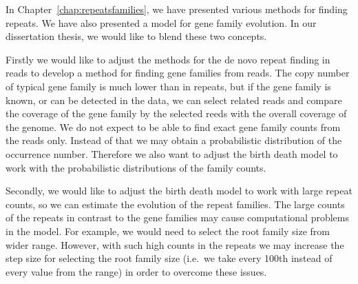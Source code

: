 In Chapter~\ref{chap:repeatsfamilies}, we have presented various methods for finding repeats. We have also presented a model for gene family evolution.
In our dissertation thesis, we would like to blend these two concepts.

Firstly we would like to adjust the methods for the de novo repeat finding in reads to develop a method for finding gene families from reads.
The copy number of typical gene family is much lower than in repeats, but if the gene family is known, or can be detected in the data, we can select related reads and compare the coverage of the gene family by the selected reeds with the overall coverage of the genome.
We do not expect to be able to find exact gene family counts from the reads only.
Instead of that we may obtain a probabilistic distribution of the occurrence number.
Therefore we also want to adjust the birth death model to work with the probabilistic distributions of the family counts.

Secondly, we would like to adjust the birth death model to work with large repeat counts, so we can estimate the evolution of the repeat families. The large counts of the repeats in contrast to the gene families may cause computational problems in the model. For example, we would need to select the root family size from wider range.
However, with such high counts in the repeats we may increase the step size for selecting the root family size (i.e.\ we take every 100th instead of every value from the range) in order to overcome these issues.
